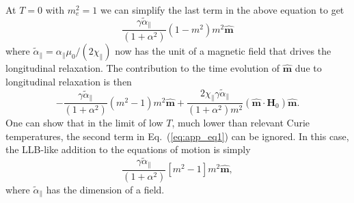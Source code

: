 \documentclass[%
 reprint,
superscriptaddress,
 amsmath,amssymb,
prb,
]{revtex4-1}
\begin{document}
%
At $T=0$ with $m_e^2=1$ we can simplify the last term in the above equation to get
\begin{equation}
    \frac{\gamma\tilde\alpha_\parallel}{(1+\alpha^2)}\left(1-m^2\right)m^2 \hat{\mathbf{m}}
\end{equation}
where $\tilde\alpha_\parallel=\alpha_\parallel\mu_0/(2\chi_\parallel)$ now has the unit of a magnetic field that drives the longitudinal relaxation. The contribution to the time evolution of $\hat{\mathbf{m}}$ due to longitudinal relaxation is then
\begin{equation}
    -\frac{\gamma\tilde\alpha_\parallel}{(1+\alpha^2)}(m^2-1)m^2\hat{\mathbf{m}}
    +\frac{2 \chi_\parallel\gamma\tilde\alpha_\parallel}{(1+\alpha^2)m^2}(\hat{\mathbf{m}}\cdot\mathbf{H}_0)\hat{\mathbf{m}}.
    \label{eq:app_eq1}
\end{equation}
%
One can show that in the limit of low $T$, much lower than relevant Curie temperatures, the second term in Eq.~(\ref{eq:app_eq1}) can be ignored. 
%
In this case, the LLB-like addition to the equations of motion is simply 
\begin{equation}
    \frac{\gamma\tilde\alpha_\parallel}{(1+\alpha^2)}
    \left[m^2-1\right]m^2\hat{\mathbf{m}},
\end{equation}
%
where $\tilde\alpha_\parallel$ has the dimension of a field.



\end{document}
